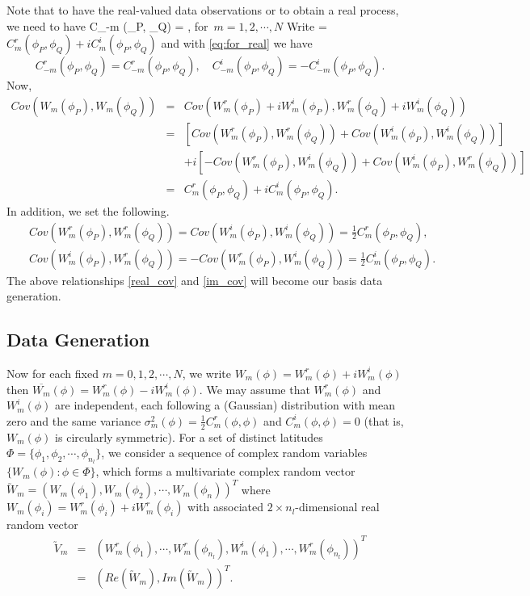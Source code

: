 Note that to have the real-valued data observations or to obtain a real process, we need to have
	\beq \label{eq:for_real}
	C_{-m} (\phi_P, \phi_Q) = , \quad \mbox{for $m = 1, 2, \cdots, N$}
	\eeq
	Write \Cm = $C_m^{r}(\phi_P, \phi_Q) + iC_m^{i}(\phi_P, \phi_Q)$ and with \eqref{eq:for_real} we have
	\[
		C_{-m}^r(\phi_P, \phi_Q) = C_{-m}^r(\phi_P, \phi_Q), \quad C_{-m}^i(\phi_P, \phi_Q) = - C_{-m}^i(\phi_P, \phi_Q).
	\]
	Now,
	\begin{eqnarray*}
		Cov(W_m(\phi_P), {W_m(\phi_Q)}) &=& Cov(W_m^r(\phi_P) + iW_m^i(\phi_P), W_m^r(\phi_Q) + i W_m^i(\phi_Q)) \\
		&=& \left[Cov(W_m^r(\phi_P), W_m^r(\phi_Q)) + Cov(W_m^i(\phi_P), W_m^i(\phi_Q))\right] \\
		& & + i\left[- Cov(W_m^r(\phi_P), W_m^i(\phi_Q)) + Cov(W_m^i(\phi_P), W_m^r(\phi_Q))\right] \\
		&=& C_m^r(\phi_P, \phi_Q) + i C_m^i(\phi_P, \phi_Q).
	\end{eqnarray*}
	In addition, we set the following.		
	\begin{eqnarray} \label{real_cov}
		& & Cov(W_m^r(\phi_P), W_m^r(\phi_Q)) = Cov(W_m^i(\phi_P), W_m^i(\phi_Q)) = \frac{1}{2}C_m^r(\phi_P, \phi_Q), \label{real_cov} \\
		& & Cov(W_m^i(\phi_P), W_m^r(\phi_Q)) = - Cov(W_m^r(\phi_P), W_m^i(\phi_Q)) = \frac{1}{2}C_m^i(\phi_P, \phi_Q). \label{im_cov}
	\end{eqnarray}
The above relationships \eqref{real_cov} and \eqref{im_cov} will become our basis data generation.
	
	
	\subsection{Data Generation}
	
Now for each fixed $m = 0, 1, 2, \cdots, N$, we write  $W_m(\phi) = W_m^r(\phi) + i W_m^i(\phi)$ then $\overline{W_m}(\phi) = W_m^r(\phi) - i W_m^i(\phi)$. We may assume that $W_m^r(\phi)$ and $W_m^i(\phi)$ are independent, each following a (Gaussian) distribution with mean zero and the same variance $\sigma_m^2(\phi) = \frac{1}{2}C_m^r(\phi, \phi)$ and $C_m^i(\phi, \phi) = 0$ (that is, $W_m(\phi)$ is circularly symmetric). For a set of distinct latitudes $\Phi = \{\phi_1, \phi_2, \cdots, \phi_{n_l}\}$, we consider a sequence of complex random variables $\{W_m(\phi): \phi \in \Phi\}$, which forms a multivariate complex random vector $\utilde{W}_m = (W_m(\phi_1), W_m(\phi_2), \cdots, W_m(\phi_n))^T$ where $W_m(\phi_i) = W_m^r(\phi_i) + iW_m^r(\phi_i)$ with associated $2\times n_l$-dimensional real random vector
\begin{eqnarray*}
		\utilde{V}_m  &=& (W_m^r(\phi_1),\cdots,W_m^r(\phi_{n_l}), W_m^i(\phi_1), \cdots, W_m^r(\phi_{n_l}))^T \\
		&=& (Re(\utilde{W}_m), Im(\utilde{W}_m))^T.
	\end{eqnarray*}

